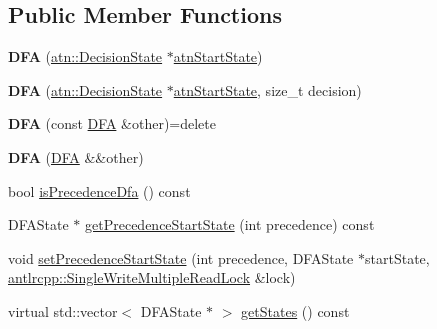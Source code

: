 \subsection*{Public Member Functions}
\begin{DoxyCompactItemize}
\item 
\mbox{\label{classantlr4_1_1dfa_1_1DFA_a96e1072f740839921fb72b3b9e9db330}} 
{\bfseries D\+FA} (\hyperlink{classantlr4_1_1atn_1_1DecisionState}{atn\+::\+Decision\+State} $\ast$\hyperlink{classantlr4_1_1dfa_1_1DFA_a83d51316351c6939e7d249dc20b5c9c8}{atn\+Start\+State})
\item 
\mbox{\label{classantlr4_1_1dfa_1_1DFA_a2597bff5bd2fea39907a0dfb02f9f8ac}} 
{\bfseries D\+FA} (\hyperlink{classantlr4_1_1atn_1_1DecisionState}{atn\+::\+Decision\+State} $\ast$\hyperlink{classantlr4_1_1dfa_1_1DFA_a83d51316351c6939e7d249dc20b5c9c8}{atn\+Start\+State}, size\+\_\+t decision)
\item 
\mbox{\label{classantlr4_1_1dfa_1_1DFA_a25516f53c648275fb491921d7f421260}} 
{\bfseries D\+FA} (const \hyperlink{classantlr4_1_1dfa_1_1DFA}{D\+FA} \&other)=delete
\item 
\mbox{\label{classantlr4_1_1dfa_1_1DFA_a4ada17f3f123b29d5bd965909bac28ee}} 
{\bfseries D\+FA} (\hyperlink{classantlr4_1_1dfa_1_1DFA}{D\+FA} \&\&other)
\item 
bool \hyperlink{classantlr4_1_1dfa_1_1DFA_a16f04e1d91f059b882505aff2174a1e1}{is\+Precedence\+Dfa} () const
\item 
D\+F\+A\+State $\ast$ \hyperlink{classantlr4_1_1dfa_1_1DFA_a6e0d2aca83d6cb0d155d971594c8dc7f}{get\+Precedence\+Start\+State} (int precedence) const
\item 
void \hyperlink{classantlr4_1_1dfa_1_1DFA_a0283251c54b224124da6fc0600717617}{set\+Precedence\+Start\+State} (int precedence, D\+F\+A\+State $\ast$start\+State, \hyperlink{classantlrcpp_1_1SingleWriteMultipleReadLock}{antlrcpp\+::\+Single\+Write\+Multiple\+Read\+Lock} \&lock)
\item 
\mbox{\label{classantlr4_1_1dfa_1_1DFA_afe9610a3706058c0d5d1e61f386ccd29}} 
virtual std\+::vector$<$ D\+F\+A\+State $\ast$ $>$ \hyperlink{classantlr4_1_1dfa_1_1DFA_afe9610a3706058c0d5d1e61f386ccd29}{get\+States} () const

\end{DoxyCompactItemize}
